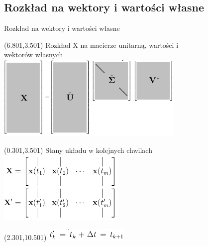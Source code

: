 \documentclass[aspectratio=169]{beamer}
\begin{document}
\subsection{Rozkład na wektory i wartości własne}
\begin{frame} {Rozkład na wektory i wartości własne}
\begin{textblock}{13}(6.801,3.501)
	Rozkład X na macierze unitarną, wartości i \\ wektorów własnych \\
	\includegraphics[width=9cm]{imgs/a_economy_svd_alf.png}
\end{textblock}
\begin{textblock}{13}(0.301,3.501)
	Stany układu w kolejnych chwilach \\
	\includegraphics[width=6cm]{imgs/a_X_svd.png}
\end{textblock}
\begin{textblock}{13}(2.301,10.501)
	\includegraphics[width=4cm]{imgs/a_t_svd.png}
\end{textblock}
\end{frame}
\end{document}
